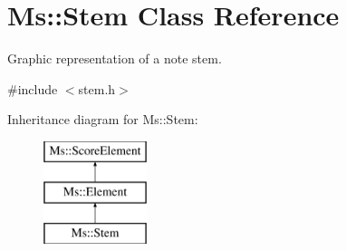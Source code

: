 \hypertarget{class_ms_1_1_stem}{}\section{Ms\+:\+:Stem Class Reference}
\label{class_ms_1_1_stem}


Graphic representation of a note stem.  




{\ttfamily \#include $<$stem.\+h$>$}

Inheritance diagram for Ms\+:\+:Stem\+:\begin{figure}[H]
\begin{center}
\leavevmode
\includegraphics[height=3.000000cm]{class_ms_1_1_stem}
\end{center}
\end{figure}
